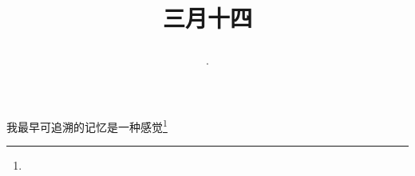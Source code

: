 \title{\date[d=22,m=4,y=2024][year:cn-y,年,month:cn,day:cn,日,·,weekday]·三月十四 }
我最早可追溯的记忆是一种感觉\footnote{ }

